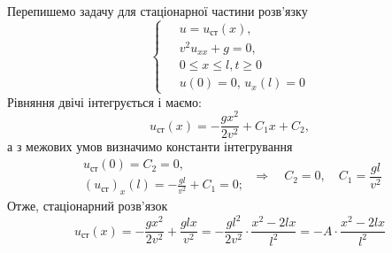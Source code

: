 Перепишемо задачу для стаціонарної частини розв'язку
\begin{equation} 
    \left\{ \begin{aligned}
            \;&u = u_{\text{ст}}(x), \\
            &v^2 u_{xx} + g = 0, \\
            &0 \leq x \leq l, t \geq 0 \\
            &u(0) = 0, \, u_x(l) = 0
    \end{aligned} \right.
\end{equation}
Рівняння двічі інтегрується і маємо:
\begin{equation}
    u_{\text{ст}}(x) = - \frac{g x^2}{2v^2} + C_1 x + C_2,
\end{equation}
а з межових умов визначимо константи інтегрування
\begin{equation}
    \begin{aligned}
        u_{\text{ст}}(0) = C_2 = 0,\\
        (u_{\text{ст}})_x(l) = -\frac{gl}{v^2} + C_1 = 0;
    \end{aligned}
    \;\Rightarrow\quad
    C_2 = 0, \quad C_1 = \frac{gl}{v^2}
\end{equation}
Отже, стаціонарний розв'язок
\begin{equation}
    u_{\text{ст}}(x) = - \frac{g x^2}{2v^2} + \frac{glx}{v^2} = - \frac{gl^2}{2v^2} \cdot \frac{x^2 - 2lx}{l^2} = -A \cdot \frac{x^2 - 2lx}{l^2}
\end{equation}

